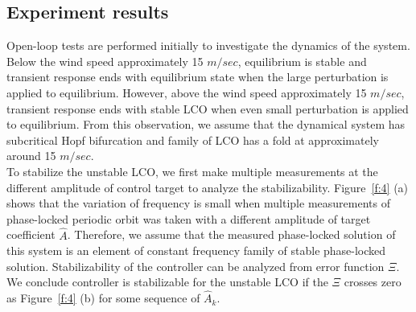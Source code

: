 \documentclass[openacc]{rsproca_new}%
\newcommand{\Fref}[1]{Figure~\ref{#1}}
\begin{document}
\subsection{Experiment results}\label{results}

Open-loop tests are performed initially to investigate the dynamics of the system. Below the wind speed approximately 15 $m/sec$, equilibrium is stable and transient response ends with equilibrium state when the large perturbation is applied to equilibrium. However, above the wind speed approximately 15 $m/sec$, transient response ends with stable LCO when even small perturbation is applied to equilibrium. From this observation, we assume that the dynamical system has subcritical Hopf bifurcation and family of LCO has a fold at approximately around 15 $m/sec$.\\
To stabilize the unstable LCO, we first make multiple measurements at the different amplitude of control target to analyze the stabilizability. \Fref{f:4} (a) shows that the variation of frequency is small when multiple measurements of phase-locked periodic orbit was taken with a different amplitude of target coefficient $\hat A$. Therefore, we assume that the measured phase-locked solution of this system is an element of constant frequency family of stable phase-locked solution. Stabilizability of the controller can be analyzed from error function $\Xi$. We conclude controller is stabilizable for the unstable LCO if the $\Xi$ crosses zero as \Fref{f:4} (b) for some sequence of $\hat A_k$.
\end{document}
